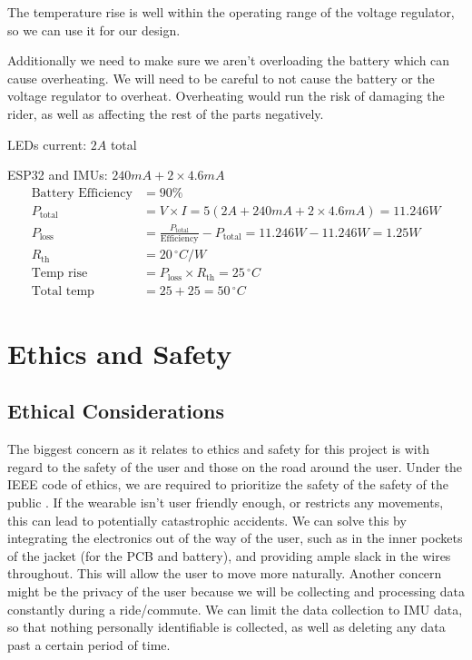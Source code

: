 \documentclass[12pt]{article}
\begin{document}
\noindent The temperature rise is well within the operating range of the voltage regulator, so we can use it for our design.


\noindent Additionally we need to make sure we aren’t 
overloading the battery which can cause overheating. We will 
need to be careful to not cause the battery or the voltage 
regulator to overheat. Overheating would run the risk of 
damaging the rider, as well as affecting the rest of the parts 
negatively.

\noindent LEDs current: \( 2A \) total 

\noindent ESP32 and IMUs: \( 240mA + 2 \times 4.6mA \)
\begin{align*}
\text{Battery Efficiency} &= 90\% \\
P_{\text{total}} &= V \times I = 5(2A + 240mA + 2 \times 4.6mA) = 11.246W \\
P_{\text{loss}} &= \frac{P_{\text{total}}}{\text{Efficiency}} - P_{\text{total}} = 11.246W - 11.246W = 1.25W \\
R_{\text{th}} &= 20 \, ^{\circ}C/W \\
\text{Temp rise} &= P_{\text{loss}} \times R_{\text{th}} = 25 \, ^{\circ}C \\
\text{Total temp} &= 25 + 25 = 50 \, ^{\circ}C
\end{align*}

\section{Ethics and Safety}
\subsection{Ethical Considerations}
The biggest concern as it relates to ethics and safety for 
this project is with regard to the safety of the user and 
those on the road around the user. Under the IEEE code of 
ethics, we are required to prioritize the safety of the 
safety of the public \cite{IEEEethics2024}. If the wearable isn’t user
friendly enough, or restricts any movements, this can lead 
to potentially catastrophic accidents. We can solve this by 
integrating the electronics out of the way of the user, 
such as in the inner pockets of the jacket (for the PCB 
and battery), and providing ample slack in the wires 
throughout. This will allow the user to move more naturally.
Another concern might be the privacy of the user \cite{IEEEethics2024}
because we will be collecting and processing data constantly 
during a ride/commute. We can limit the data collection to 
IMU data, so that nothing personally identifiable is
collected, as well as deleting any data past a certain 
period of time. 
\end{document}
